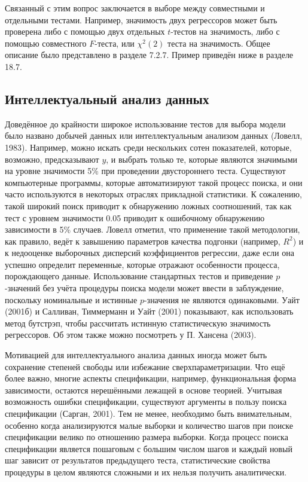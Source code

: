 Связанный с этим вопрос заключается в выборе между совместными и отдельными тестами. Например, значимость двух регрессоров может быть проверена либо с помощью двух отдельных $t$-тестов на значимость, либо с помощью совместного $F$-теста, или $\chi^2(2)$ теста на значимость. Общее описание было представлено в разделе 7.2.7. Пример приведён ниже в разделе 18.7.

\subsection{Интеллектуальный анализ данных}

Доведённое до крайности широкое использование тестов для выбора модели было названо добычей данных или интеллектуальным анализом данных (Ловелл, 1983). Например, можно искать среди нескольких сотен показателей, которые, возможно, предсказывают $y$, и выбрать только те, которые являются значимыми на уровне значимости 5\% при проведении двустороннего теста. Существуют компьютерные программы, которые автоматизируют такой процесс поиска, и они часто используются в некоторых отраслях прикладной статистики. К сожалению, такой широкий поиск приводит к обнаружению ложных соотношений, так как тест с уровнем значимости 0.05 приводит к ошибочному обнаружению зависимости в 5\% случаев. Ловелл отметил, что применение такой методологии, как правило, ведёт к завышению параметров качества подгонки (например, $R^2$) и к недооценке выборочных дисперсий коэффициентов регрессии, даже если она успешно определит переменные, которые отражают особенности процесса, порождающего данные. Использование стандартных тестов и приведение $p$-значений без учёта процедуры поиска модели может ввести в заблуждение, поскольку номинальные и истинные $p$-значения не являются одинаковыми. Уайт (2001б) и Салливан, Тиммерманн и Уайт (2001) показывают, как использовать метод бутстрэп, чтобы рассчитать истинную статистическую значимость регрессоров. Об этом также можно посмотреть у П. Хансена (2003).

Мотивацией для интеллектуального анализа данных иногда может быть сохранение степеней свободы или избежание сверхпараметризации. Что ещё более важно, многие аспекты спецификации, например, функциональная форма зависимости, остаются нерешёнными лежащей в основе теорией. Учитывая возможность ошибки спецификации,  существуют аргументы в пользу поиска спецификации (Сарган, 2001). Тем не менее, необходимо быть внимательным, особенно когда анализируются малые выборки и количество шагов при поиске спецификации велико по отношению размера выборки. Когда процесс поиска спецификации является пошаговым с большим числом шагов и каждый новый шаг зависит от результатов предыдущего теста, статистические свойства процедуры в целом являются сложными и их нельзя получить аналитически.

